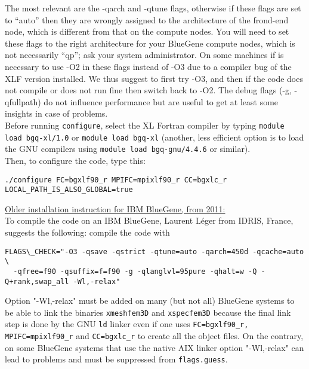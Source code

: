 \noindent
The most relevant are the -qarch and -qtune flags, otherwise if these flags are set to ``auto'' then they are wrongly assigned to
the architecture of the frond-end node, which is different from that on the compute nodes.
You will need to set these flags to the right architecture for your BlueGene compute nodes, which is not necessarily ``qp'';
ask your system administrator.
On some machines if is necessary to use -O2 in these flags instead of -O3 due to a compiler bug of the XLF version installed.
We thus suggest to first try -O3, and then if the code does not compile or does not run fine then switch back to -O2.
The debug flags (-g, -qfullpath) do not influence performance but are useful to get at least some insights in case of problems.\\

\noindent
Before running \texttt{configure}, select the XL Fortran compiler by typing \texttt{module load bgq-xl/1.0}
or \texttt{module load bgq-xl} (another, less efficient option is to load the GNU compilers using \texttt{module load bgq-gnu/4.4.6} or similar).\\

\noindent
Then, to configure the code, type this:
\begin{verbatim}
./configure FC=bgxlf90_r MPIFC=mpixlf90_r CC=bgxlc_r LOCAL_PATH_IS_ALSO_GLOBAL=true
\end{verbatim}

\noindent
\underline{Older installation instruction for IBM BlueGene, from 2011:}\\

\noindent
To compile the code on an IBM BlueGene, Laurent L\'eger from IDRIS, France, suggests the following: compile the code with
\begin{verbatim}
FLAGS\_CHECK="-O3 -qsave -qstrict -qtune=auto -qarch=450d -qcache=auto \
  -qfree=f90 -qsuffix=f=f90 -g -qlanglvl=95pure -qhalt=w -Q -Q+rank,swap_all -Wl,-relax"
\end{verbatim}

\noindent
Option "-Wl,-relax" must be added on many (but not all) BlueGene systems to be able to link the binaries \texttt{xmeshfem3D}
and \texttt{xspecfem3D} because the final link step is done by the GNU \texttt{ld} linker even if
one uses \texttt{FC=bgxlf90\_r, MPIFC=mpixlf90\_r} and \texttt{CC=bgxlc\_r} to create all the object files.
On the contrary, on some BlueGene systems that use the native AIX linker option "-Wl,-relax" can lead to problems and must be suppressed from \texttt{flags.guess}.

